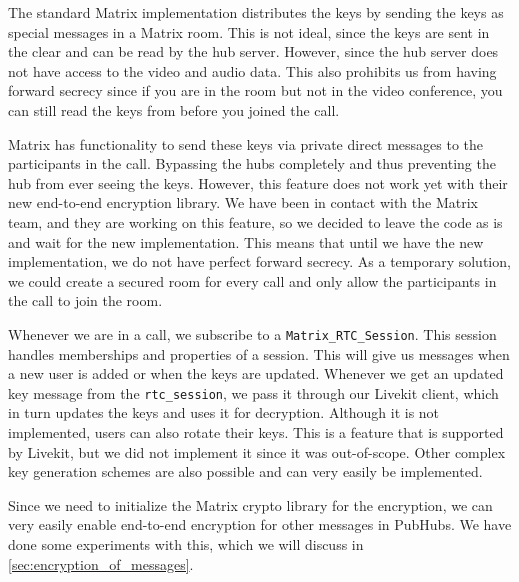 \documentclass{report}
\begin{document}
The standard Matrix implementation distributes the keys by sending the keys as special messages in a Matrix room.
This is not ideal, since the keys are sent in the clear and can be read by the hub server. However, since the hub
server does not have access to the video and audio data. This also prohibits us from having forward secrecy since if
you are in the room but not in the video conference, you can still read the keys from before you joined the call.

Matrix has functionality to send these keys via private direct messages to the participants in the call. Bypassing
the hubs completely and thus preventing the hub from ever seeing the keys. However, this feature does not work yet 
with their new end-to-end encryption library. We have been in contact with the Matrix team, and they are working 
on this feature, so we decided to leave the code as is and wait for the new implementation. This means that until
we have the new implementation, we do not have perfect forward secrecy. As a temporary solution, we could create
a secured room for every call and only allow the participants in the call to join the room.

Whenever we are in a call, we subscribe to a \lstinline[language=js]{Matrix_RTC_Session}. This session handles
memberships and properties of a session. This will give us messages when a new user is added or when the keys are
updated. Whenever we get an updated key message from the \lstinline[language=js]{rtc_session}, we pass it through
our Livekit client, which in turn updates the keys and uses it for decryption. Although it is not implemented, users
can also rotate their keys. This is a feature that is supported by Livekit, but we did not implement it since it was
out-of-scope. Other complex key generation schemes are also possible and can very easily be implemented.

Since we need to initialize the Matrix crypto library for the encryption, we can very easily enable end-to-end
encryption for other messages in PubHubs. We have done some experiments with this, which we will discuss in \autoref{sec:encryption_of_messages}.
\end{document}
